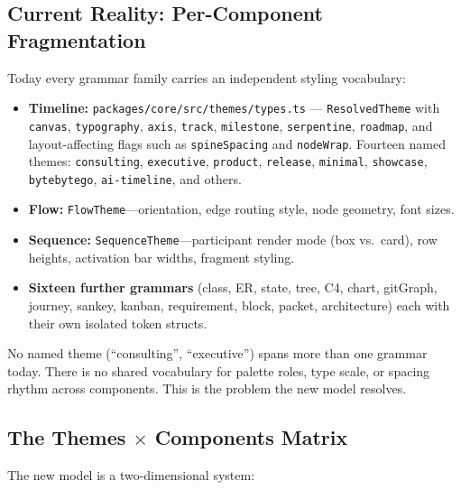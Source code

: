 \subsection{Current Reality: Per-Component Fragmentation}
\label{sec:themes-fragmentation}

Today every grammar family carries an independent styling vocabulary:

\begin{itemize}
  \item \textbf{Timeline:} \texttt{packages/core/src/themes/types.ts} ---
        \texttt{ResolvedTheme} with \texttt{canvas}, \texttt{typography},
        \texttt{axis}, \texttt{track}, \texttt{milestone}, \texttt{serpentine},
        \texttt{roadmap}, and layout-affecting flags such as
        \texttt{spineSpacing} and \texttt{nodeWrap}. Fourteen named themes:
        \texttt{consulting}, \texttt{executive}, \texttt{product}, \texttt{release},
        \texttt{minimal}, \texttt{showcase}, \texttt{bytebytego}, \texttt{ai-timeline},
        and others.
  \item \textbf{Flow:} \texttt{FlowTheme}---orientation, edge routing style, node
        geometry, font sizes.
  \item \textbf{Sequence:} \texttt{SequenceTheme}---participant render mode (box vs.\
        card), row heights, activation bar widths, fragment styling.
  \item \textbf{Sixteen further grammars} (class, ER, state, tree, C4, chart,
        gitGraph, journey, sankey, kanban, requirement, block, packet, architecture)
        each with their own isolated token structs.
\end{itemize}

No named theme (``consulting'', ``executive'') spans more than one grammar today. There is no
shared vocabulary for palette roles, type scale, or spacing rhythm across components.
This is the problem the new model resolves.

\subsection{The Themes $\times$ Components Matrix}
\label{sec:themes-matrix}

The new model is a two-dimensional system:

